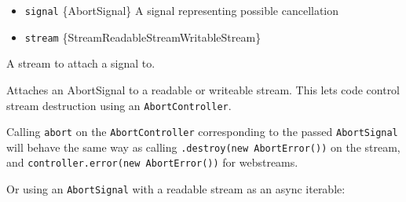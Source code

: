 \begin{itemize}
\tightlist
\item
  \texttt{signal} \{AbortSignal\} A signal representing possible
  cancellation
\item
  \texttt{stream}
  \{Stream\textbar ReadableStream\textbar WritableStream\}
\end{itemize}

A stream to attach a signal to.

Attaches an AbortSignal to a readable or writeable stream. This lets
code control stream destruction using an \texttt{AbortController}.

Calling \texttt{abort} on the \texttt{AbortController} corresponding to
the passed \texttt{AbortSignal} will behave the same way as calling
\texttt{.destroy(new\ AbortError())} on the stream, and
\texttt{controller.error(new\ AbortError())} for webstreams.

\begin{Shaded}
\begin{Highlighting}[]
\OperatorTok{=} \NormalTok{(}\NormalTok{)}\OperatorTok{;}

\OperatorTok{=}  \NormalTok{()}\OperatorTok{;}
\OperatorTok{=} \NormalTok{(}
\OperatorTok{,}
\NormalTok{((}\NormalTok{))}\OperatorTok{,}
\NormalTok{)}\OperatorTok{;}
\NormalTok{()}\OperatorTok{;}
\end{Highlighting}
\end{Shaded}

Or using an \texttt{AbortSignal} with a readable stream as an async
iterable:

